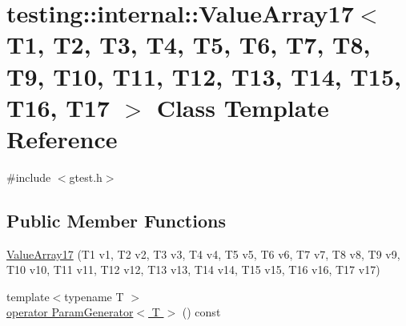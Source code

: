 \hypertarget{classtesting_1_1internal_1_1_value_array17}{\section{testing\-:\-:internal\-:\-:Value\-Array17$<$ T1, T2, T3, T4, T5, T6, T7, T8, T9, T10, T11, T12, T13, T14, T15, T16, T17 $>$ Class Template Reference}
\label{classtesting_1_1internal_1_1_value_array17}
}


{\ttfamily \#include $<$gtest.\-h$>$}

\subsection*{Public Member Functions}
\begin{DoxyCompactItemize}
\item 
\hyperlink{classtesting_1_1internal_1_1_value_array17_a943a86a365abde6bdd667e1ad2dbff9b}{Value\-Array17} (T1 v1, T2 v2, T3 v3, T4 v4, T5 v5, T6 v6, T7 v7, T8 v8, T9 v9, T10 v10, T11 v11, T12 v12, T13 v13, T14 v14, T15 v15, T16 v16, T17 v17)
\item 
{\footnotesize template$<$typename T $>$ }\\\hyperlink{classtesting_1_1internal_1_1_value_array17_a439999d722868f07a54925ec22d9f538}{operator Param\-Generator$<$ T $>$} () const 
\end{DoxyCompactItemize}


